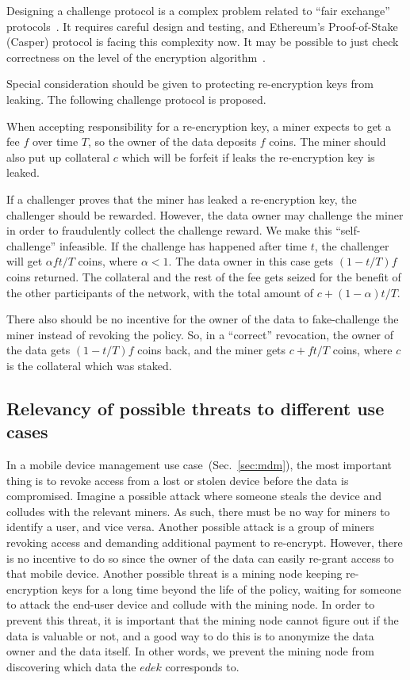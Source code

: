 \documentclass[longbibliography,nofootinbib]{revtex4-1}
\begin{document}
\begin{CJK*}{UTF8}{gbsn}
Designing a challenge protocol is a complex problem related to ``fair exchange'' protocols~\cite{BitcoinMPC2016,Bentov2014,AccountableStorage}.
It requires careful design and testing, and Ethereum's Proof-of-Stake (Casper) protocol is facing this complexity now.
It may be possible to just check correctness on the level of the encryption algorithm~\cite{Zhou2002}.

Special consideration should be given to protecting re-encryption keys from leaking.
The following challenge protocol is proposed.

When accepting responsibility for a re-encryption key, a miner expects to get a fee $f$ over time $T$, so the owner of the data deposits $f$ coins.
The miner should also put up collateral $c$ which will be forfeit if leaks the re-encryption key is leaked.

If a challenger proves that the miner has leaked a re-encryption key, the challenger should be rewarded.
However, the data owner may challenge the miner in order to fraudulently collect the challenge reward.
We make this ``self-challenge'' infeasible.
If the challenge has happened after time $t$, the challenger will get
$\alpha f t/T$ coins, where $\alpha < 1$.
The data owner in this case gets $(1 - t/T) f$ coins returned.
The collateral and the rest of the fee gets seized for the benefit of the other participants of the network, with the total amount of $c + (1 - \alpha) t/T$.

There also should be no incentive for the owner of the data to fake-challenge the miner instead of revoking the policy.
So, in a ``correct'' revocation, the owner of the data gets $(1 - t/T) f$ coins back, and the miner gets $c + ft/T$ coins, where $c$ is the collateral which
was staked.


\subsection{Relevancy of possible threats to different use cases}

In a mobile device management use case~(Sec.~\ref{sec:mdm}),
the most important thing is to revoke access from a lost or stolen device before the data is compromised.
Imagine a possible attack where someone steals the device and colludes with the relevant miners.
As such, there must be no way for miners to identify a user, and vice versa.
Another possible attack is a group of miners revoking access and demanding additional payment to re-encrypt.
However, there is no incentive to do so since the owner of the data can easily re-grant access to that mobile device.
Another possible threat is a mining node keeping re-encryption keys for a long time beyond the life of the policy,
waiting for someone to attack the end-user device and collude with the mining node.
In order to prevent this threat, it is important that the mining node cannot figure out if the data is valuable or not,
and a good way to do this is to anonymize the data owner and the data itself.
In other words, we prevent the mining node from discovering which data the $edek$ corresponds to.


\end{CJK*}
\end{document}
